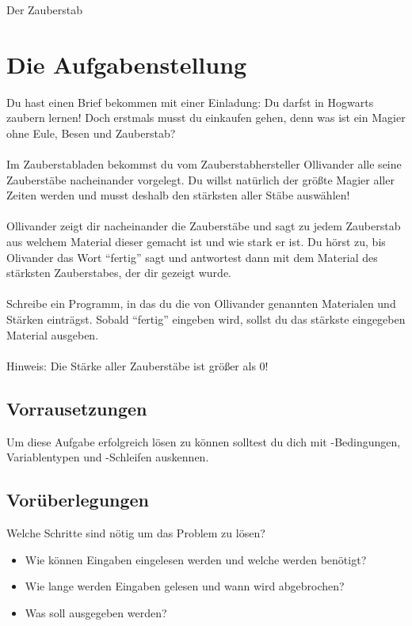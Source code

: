 \documentclass{\VorlagenPfad/coderdojokatext}
\newcommand{\Titel}{Der Zauberstab}
\begin{document}
	
	
	\begin{center}
		{\huge \Titel}
	\end{center}
	
	\section{Die Aufgabenstellung} Du hast einen Brief bekommen mit einer Einladung: Du darfst in Hogwarts zaubern lernen! Doch erstmals musst du einkaufen gehen, denn was ist ein Magier ohne Eule, Besen und Zauberstab?
	\\ \\
	Im Zauberstabladen bekommst du vom Zauberstabhersteller Ollivander alle seine Zauberstäbe nacheinander vorgelegt. Du willst natürlich der größte Magier aller Zeiten werden und musst deshalb den stärksten aller Stäbe auswählen!
	\\ \\
	Ollivander zeigt dir nacheinander die Zauberstäbe und sagt zu jedem Zauberstab aus welchem Material dieser gemacht ist und wie stark er ist.
	Du hörst zu, bis Olivander das Wort "`fertig"' sagt und antwortest dann mit dem Material des stärksten Zauberstabes, der dir gezeigt wurde.
	\\ \\
	Schreibe ein Programm, in das du die von Ollivander genannten Materialen und Stärken einträgst. Sobald "`fertig"' eingeben wird, sollst du das stärkste eingegeben Material ausgeben.
	\\
	\\
	Hinweis: Die Stärke aller Zauberstäbe ist größer als 0!
	
	\subsection{Vorrausetzungen} Um diese Aufgabe erfolgreich lösen zu können solltest du dich mit -Bedingungen, Variablentypen und -Schleifen auskennen.
	\subsection{Vorüberlegungen}
	Welche Schritte sind nötig um das Problem zu lösen?
	\begin{itemize}
		\item Wie können Eingaben eingelesen werden und welche werden benötigt?
		\item Wie lange werden Eingaben gelesen und wann wird abgebrochen?
		\item Was soll ausgegeben werden?
	\end{itemize}
\end{document}
